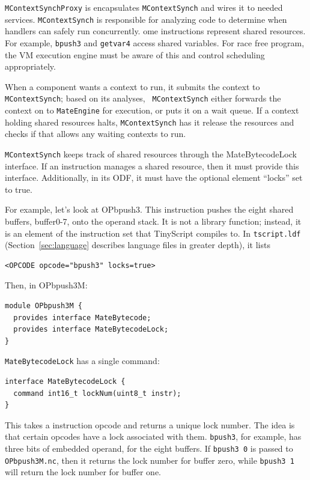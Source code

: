 \documentclass[12pt]{article}
\begin{document}
{\tt MContextSynchProxy} is encapsulates {\tt MContextSynch} and wires
it to needed services. {\tt MContextSynch} is responsible for
analyzing code to determine when handlers can safely run
concurrently. ome instructions represent shared resources. For
example, {\tt bpush3} and {\tt getvar4} access shared variables. For
race free program, the VM execution engine must be aware of this and
control scheduling appropriately.

When a component wants a context to run, it submits the
context to {\tt MContextSynch}; based on its analyses, {\tt
MContextSynch} either forwards the context on to {\tt MateEngine} for
execution, or puts it on a wait queue. If a context holding shared
resources halts, {\tt MContextSynch} has it release the resources and
checks if that allows any waiting contexts to run.

{\tt MContextSynch} keeps track of shared resources through the
MateBytecodeLock interface. If an instruction manages a shared
resource, then it must provide this interface. Additionally, in its
ODF, it must have the optional element ``locks'' set to true.

For example, let's look at OPbpush3. This instruction pushes the eight
shared buffers, buffer0-7, onto the operand stack. It is not a library
function; instead, it is an element of the instruction set that
TinyScript compiles to. In {\tt tscript.ldf}
(Section~\ref{sec:language} describes language files in greater
depth), it lists

{\scriptsize
\begin{verbatim}
<OPCODE opcode="bpush3" locks=true>
\end{verbatim}
}

Then, in OPbpush3M:

{\scriptsize
\begin{verbatim}
module OPbpush3M {
  provides interface MateBytecode;
  provides interface MateBytecodeLock;
}
\end{verbatim}
}

{\tt MateBytecodeLock} has a single command:

{\scriptsize
\begin{verbatim}
interface MateBytecodeLock {
  command int16_t lockNum(uint8_t instr);
}
\end{verbatim}
}

This takes a instruction opcode and returns a unique lock
number. The idea is that certain opcodes have a lock associated with
them. {\tt bpush3}, for example, has three bits of embedded operand, for
the eight buffers. If {\tt bpush3 0} is passed to {\tt OPbpush3M.nc},
then it returns the lock number for buffer zero, while {\tt bpush3 1}
will return the lock number for buffer one.
\end{document}
